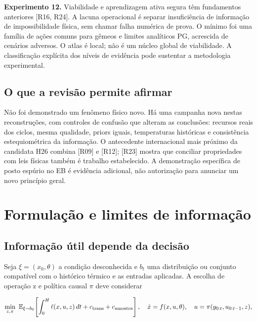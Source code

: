 \documentclass[
  11pt,
  letterpaper,
]{article}
\begin{document}
\textbf{Experimento 12.} Viabilidade e aprendizagem ativa segura têm
fundamentos anteriores {[}R16, R24{]}. A lacuna operacional é separar
insuficiência de informação de impossibilidade física, sem chamar falha
numérica de prova. O mínimo foi uma família de ações comuns para gêmeos
e limites analíticos PG, acrescida de cenários adversos. O atlas é
local; não é um núcleo global de viabilidade. A classificação explícita
dos níveis de evidência pode sustentar a metodologia experimental.

\hypertarget{o-que-a-revisuxe3o-permite-afirmar}{%
\subsection{O que a revisão permite
afirmar}\label{o-que-a-revisuxe3o-permite-afirmar}}

Não foi demonstrado um fenômeno físico novo. Há uma campanha nova nestas
reconstruções, com controles de confusão que alteram as conclusões:
recursos reais dos ciclos, mesma qualidade, priors iguais, temperaturas
históricas e consistência estequiométrica da informação. O antecedente
internacional mais próximo da candidata H26 combina {[}R09{]} e
{[}R12{]}; {[}R23{]} mostra que conciliar propriedades com leis físicas
também é trabalho estabelecido. A demonstração específica de posto
espúrio no EB é evidência adicional, não autorização para anunciar um
novo princípio geral.

\hypertarget{formulauxe7uxe3o-e-limites-de-informauxe7uxe3o}{%
\section{Formulação e limites de
informação}\label{formulauxe7uxe3o-e-limites-de-informauxe7uxe3o}}

\hypertarget{informauxe7uxe3o-uxfatil-depende-da-decisuxe3o}{%
\subsection{Informação útil depende da
decisão}\label{informauxe7uxe3o-uxfatil-depende-da-decisuxe3o}}

Seja \(\xi=(x_0,\theta)\) a condição desconhecida e \(b_t\) uma
distribuição ou conjunto compatível com o histórico térmico e as
entradas aplicadas. A escolha de operação z e política causal \(\pi\)
deve considerar

\[
\min_{z,\pi}\ \mathbb E_{\xi\sim b_0}\!
\left[\int_0^H \ell(x,u,z)\,dt+c_{\rm trans}+c_{\rm amostra}\right],
\quad \dot x=f(x,u,\theta),\quad u=\pi(y_{0:t},u_{0:t-1},z),
\]
\end{document}
